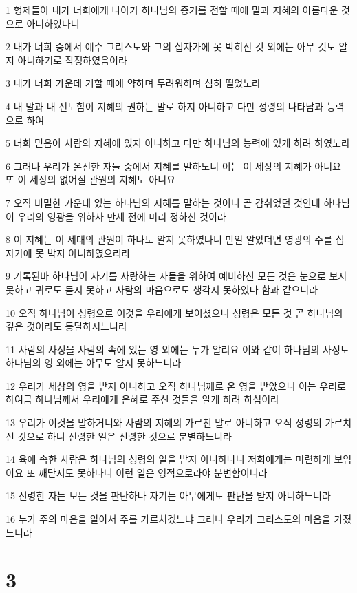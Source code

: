 \par 1 형제들아 내가 너희에게 나아가 하나님의 증거를 전할 때에 말과 지혜의 아름다운 것으로 아니하였나니
\par 2 내가 너희 중에서 예수 그리스도와 그의 십자가에 못 박히신 것 외에는 아무 것도 알지 아니하기로 작정하였음이라
\par 3 내가 너희 가운데 거할 때에 약하며 두려워하며 심히 떨었노라
\par 4 내 말과 내 전도함이 지혜의 권하는 말로 하지 아니하고 다만 성령의 나타남과 능력으로 하여
\par 5 너희 믿음이 사람의 지혜에 있지 아니하고 다만 하나님의 능력에 있게 하려 하였노라
\par 6 그러나 우리가 온전한 자들 중에서 지혜를 말하노니 이는 이 세상의 지혜가 아니요 또 이 세상의 없어질 관원의 지혜도 아니요
\par 7 오직 비밀한 가운데 있는 하나님의 지혜를 말하는 것이니 곧 감취었던 것인데 하나님이 우리의 영광을 위하사 만세 전에 미리 정하신 것이라
\par 8 이 지혜는 이 세대의 관원이 하나도 알지 못하였나니 만일 알았더면 영광의 주를 십자가에 못 박지 아니하였으리라
\par 9 기록된바 하나님이 자기를 사랑하는 자들을 위하여 예비하신 모든 것은 눈으로 보지 못하고 귀로도 듣지 못하고 사람의 마음으로도 생각지 못하였다 함과 같으니라
\par 10 오직 하나님이 성령으로 이것을 우리에게 보이셨으니 성령은 모든 것 곧 하나님의 깊은 것이라도 통달하시느니라
\par 11 사람의 사정을 사람의 속에 있는 영 외에는 누가 알리요 이와 같이 하나님의 사정도 하나님의 영 외에는 아무도 알지 못하느니라
\par 12 우리가 세상의 영을 받지 아니하고 오직 하나님께로 온 영을 받았으니 이는 우리로 하여금 하나님께서 우리에게 은혜로 주신 것들을 알게 하려 하심이라
\par 13 우리가 이것을 말하거니와 사람의 지혜의 가르친 말로 아니하고 오직 성령의 가르치신 것으로 하니 신령한 일은 신령한 것으로 분별하느니라
\par 14 육에 속한 사람은 하나님의 성령의 일을 받지 아니하나니 저희에게는 미련하게 보임이요 또 깨닫지도 못하나니 이런 일은 영적으로라야 분변함이니라
\par 15 신령한 자는 모든 것을 판단하나 자기는 아무에게도 판단을 받지 아니하느니라
\par 16 누가 주의 마음을 알아서 주를 가르치겠느냐 그러나 우리가 그리스도의 마음을 가졌느니라

\chapter{3}

